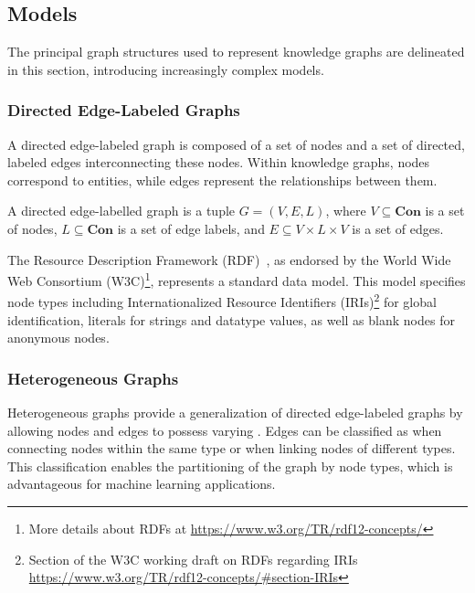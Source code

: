 \subsection{Models}\label{models}
The principal graph structures used to represent knowledge graphs are delineated in this section, introducing increasingly complex models.

\subsubsection{Directed Edge-Labeled Graphs}\label{models:directed_edge_labeled_graphs}
A directed edge-labeled graph is composed of a set of nodes and a set of directed, labeled edges interconnecting these nodes. Within knowledge graphs, nodes correspond to entities, while edges represent the relationships between them. 

\begin{definition}\label{def:directed-edge-labelled-graph}
    A directed edge-labelled graph is a tuple $G = (V, E, L)$, where $V \subseteq \textbf{Con}$ is a set of nodes, $L \subseteq \textbf{Con}$ is a set of edge labels, and $E \subseteq V \times L \times V$ is a set of edges.
\end{definition}

The Resource Description Framework (RDF)~\cite{Cyganiak2014rdf}, as endorsed by the World Wide Web Consortium (W3C)\footnote{More details about RDFs at \url{https://www.w3.org/TR/rdf12-concepts/}}, represents a standard data model. This model specifies node types including Internationalized Resource Identifiers (IRIs)\footnote{Section of the W3C working draft on RDFs regarding IRIs \url{https://www.w3.org/TR/rdf12-concepts/\#section-IRIs}} for global identification, literals for strings and datatype values, as well as blank nodes for anonymous nodes.

\subsubsection{Heterogeneous Graphs}
Heterogeneous graphs provide a generalization of directed edge-labeled graphs by allowing nodes and edges to possess varying . Edges can be classified as  when connecting nodes within the same type or  when linking nodes of different types. This classification enables the partitioning of the graph by node types, which is advantageous for machine learning applications.

